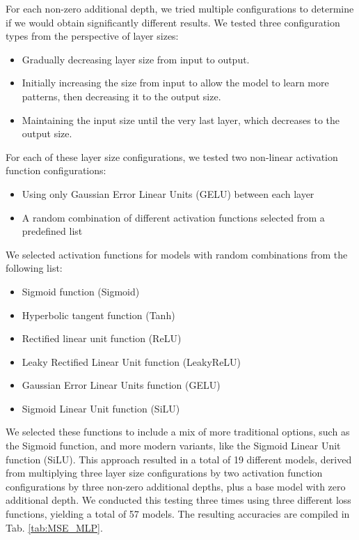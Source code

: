 For each non-zero additional depth, we tried multiple configurations to determine if we would obtain significantly different results. We tested three configuration types from the perspective of layer sizes:

\begin{itemize}
	\item Gradually decreasing layer size from input to output.
	\item Initially increasing the size from input to allow the model to learn more patterns, then decreasing it to the output size.
	\item Maintaining the input size until the very last layer, which decreases to the output size.
\end{itemize}

For each of these layer size configurations, we tested two non-linear activation function configurations:

\begin{itemize}
	\item Using only Gaussian Error Linear Units (GELU) between each layer
	\item A random combination of different activation functions selected from a predefined list
\end{itemize}

We selected activation functions for models with random combinations from the following list:

\begin{itemize}
	\item Sigmoid function (Sigmoid)
	\item Hyperbolic tangent function (Tanh)
	\item Rectified linear unit function (ReLU)
	\item Leaky Rectified Linear Unit function (LeakyReLU)
	\item Gaussian Error Linear Units function (GELU)
	\item Sigmoid Linear Unit function (SiLU)
\end{itemize}

We selected these functions to include a mix of more traditional options, such as the Sigmoid function, and more modern variants, like the Sigmoid Linear Unit function (SiLU). This approach resulted in a total of 19 different models, derived from multiplying three layer size configurations by two activation function configurations by three non-zero additional depths, plus a base model with zero additional depth. We conducted this testing three times using three different loss functions, yielding a total of 57 models. The resulting accuracies are compiled in Tab. \ref{tab:MSE_MLP}.
\\


